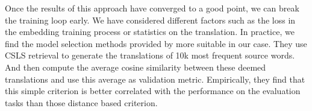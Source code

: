 \begin{itemize}
	Once the results of this approach have converged to a good point, we can break the training loop early. We have considered  different factors such as the loss in the embedding training process or statistics on the translation. In practice, we find the model selection methods provided by \cite{DBLP:journals/corr/abs-1710-04087} more suitable in our case. They use CSLS retrieval to generate the translations of 10k most frequent source words. And then compute the average cosine similarity between these deemed translations and use this average as validation metric. Empirically, they find that this simple criterion is better correlated with the performance on the evaluation tasks than those distance based criterion.
\end{itemize}
